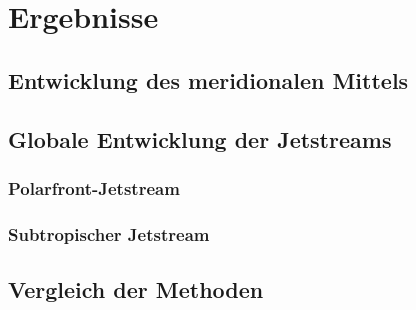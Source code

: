 \chapter{Ergebnisse}

\section{Entwicklung des meridionalen Mittels}
\blindtext

\section{Globale Entwicklung der Jetstreams}
\blindtext

\subsection{Polarfront-Jetstream}
\blindtext

\subsection{Subtropischer Jetstream}
\blindtext

\section{Vergleich der Methoden}
\blindtext
